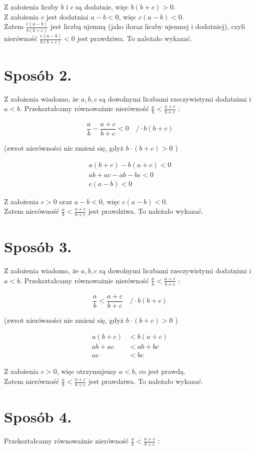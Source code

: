 \documentclass[10pt]{article}
\begin{document}
Z założenia liczby $b$ i $c$ są dodatnie, więc $b(b+c)>0$.\\
Z założenia $c$ jest dodatniai $a-b<0$, więc $c(a-b)<0$.\\
Zatem $\frac{c(a-b)}{b(b+c)}$ jest liczbą ujemną (jako iloraz liczby ujemnej i dodatniej), czyli nierówność $\frac{c(a-b)}{b(b+c)}<0$ jest prawdziwa. To należało wykazać.

\section*{Sposób 2.}
Z założenia wiadomo, że $a, b, c$ są dowolnymi liczbami rzeczywistymi dodatnimi i $a<b$. Przekształcamy równoważnie nierówność $\frac{a}{b}<\frac{a+c}{b+c}$ :

$$
\frac{a}{b}-\frac{a+c}{b+c}<0 \quad / \cdot b(b+c)
$$

(zwrot nierówności nie zmieni się, gdyż $b \cdot(b+c)>0$ )

$$
\begin{gathered}
a(b+c)-b(a+c)<0 \\
a b+a c-a b-b c<0 \\
c(a-b)<0
\end{gathered}
$$

Z założenia $c>0$ oraz $a-b<0$, więc $c(a-b)<0$.\\
Zatem nierówność $\frac{a}{b}<\frac{a+c}{b+c}$ jest prawdziwa. To należało wykazać.

\section*{Sposób 3.}
Z założenia wiadomo, że $a, b, c$ są dowolnymi liczbami rzeczywistymi dodatnimi i $a<b$. Przekształcamy równoważnie nierówność $\frac{a}{b}<\frac{a+c}{b+c}$ :

$$
\frac{a}{b}<\frac{a+c}{b+c} \quad / \cdot b(b+c)
$$

(zwrot nierówności nie zmieni się, gdyż $b \cdot(b+c)>0$ )

$$
\begin{aligned}
a(b+c) & <b(a+c) \\
a b+a c & <a b+b c \\
a c & <b c
\end{aligned}
$$

Z założenia $c>0$, więc otrzymujemy $a<b$, co jest prawdą.\\
Zatem nierówność $\frac{a}{b}<\frac{a+c}{b+c}$ jest prawdziwa. To należało wykazać.

\section*{Sposób 4.}
Przekształcamy równoważnie nierówność $\frac{a}{b}<\frac{a+c}{b+c}$ :
\end{document}
